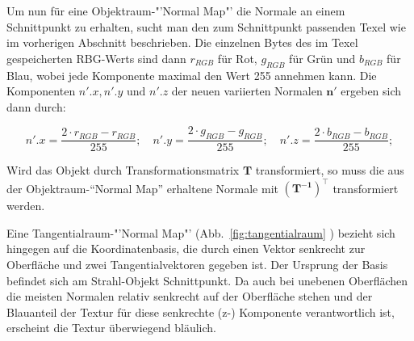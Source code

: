 Um nun für eine Objektraum-"'Normal Map"' die Normale an einem Schnittpunkt zu erhalten, sucht man den zum Schnittpunkt passenden Texel wie im vorherigen Abschnitt beschrieben. Die einzelnen Bytes des im Texel gespeicherten RBG-Werts sind dann \( r_{RGB} \) für Rot, \( g_{RGB} \) für Grün und \( b_{RGB} \) für Blau, wobei jede Komponente maximal den Wert 255 annehmen kann. Die Komponenten \( {n'}.x, {n'}.y \text{ und } {n'}.z \) der neuen variierten Normalen \( \boldsymbol{n'} \) ergeben sich dann durch:

\begin{equation}
    n'.x = \frac{2 \cdot r_{RGB} - r_{RGB}}{255}; \quad n'.y = \frac{2 \cdot g_{RGB} - g_{RGB}}{255}; \quad
    n'.z = \frac{2 \cdot b_{RGB} - b_{RGB}}{255}; \label{eq:texel_vektor}
\end{equation}

Wird das Objekt durch Transformationsmatrix \( \boldsymbol{T} \) transformiert, so muss die aus der Objektraum-"`Normal Map"' erhaltene Normale mit \( \boldsymbol{(T^{-1})}^\intercal \) transformiert werden.


Eine Tangentialraum-"'Normal Map"' (Abb.~\ref{fig:tangentialraum} ) bezieht sich hingegen auf die Koordinatenbasis, die durch einen Vektor senkrecht zur Oberfläche und zwei Tangentialvektoren gegeben ist. Der Ursprung der Basis befindet sich am Strahl-Objekt Schnittpunkt. Da auch bei unebenen Oberflächen die meisten Normalen relativ senkrecht auf der Oberfläche stehen und der Blauanteil der Textur für diese senkrechte (z-) Komponente verantwortlich ist, erscheint die Textur überwiegend bläulich.

